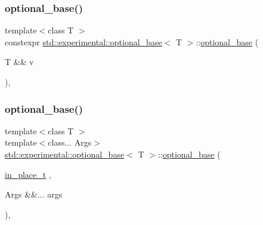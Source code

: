 \mbox{\label{structstd_1_1experimental_1_1optional__base_ad4839801777f8cfeb048f16b02df4c44}} 
\subsubsection{\texorpdfstring{optional\+\_\+base()}{optional\_base()}\hspace{0.1cm}{\footnotesize\ttfamily [3/5]}}
{\footnotesize\ttfamily template$<$class T $>$ \\
constexpr \mbox{\hyperlink{structstd_1_1experimental_1_1optional__base}{std\+::experimental\+::optional\+\_\+base}}$<$ T $>$\+::\mbox{\hyperlink{structstd_1_1experimental_1_1optional__base}{optional\+\_\+base}} (\begin{DoxyParamCaption}\item[{T \&\&}]{v }\end{DoxyParamCaption})\hspace{0.3cm}{\ttfamily [inline]}, {\ttfamily [explicit]}}

\mbox{\label{structstd_1_1experimental_1_1optional__base_aa5983374de32e763d1b676ccfe834d05}} 
\subsubsection{\texorpdfstring{optional\+\_\+base()}{optional\_base()}\hspace{0.1cm}{\footnotesize\ttfamily [4/5]}}
{\footnotesize\ttfamily template$<$class T $>$ \\
template$<$class... Args$>$ \\
\mbox{\hyperlink{structstd_1_1experimental_1_1optional__base}{std\+::experimental\+::optional\+\_\+base}}$<$ T $>$\+::\mbox{\hyperlink{structstd_1_1experimental_1_1optional__base}{optional\+\_\+base}} (\begin{DoxyParamCaption}\item[{\mbox{\hyperlink{structstd_1_1experimental_1_1in__place__t}{in\+\_\+place\+\_\+t}}}]{,  }\item[{Args \&\&...}]{args }\end{DoxyParamCaption})\hspace{0.3cm}{\ttfamily [inline]}, {\ttfamily [explicit]}}

